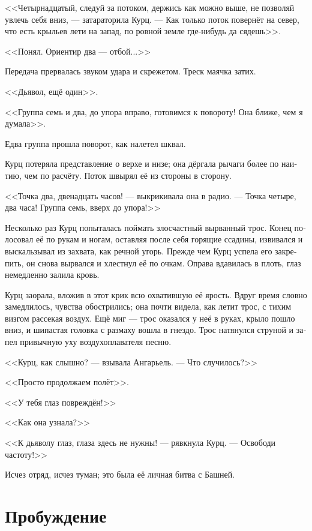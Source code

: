 \documentclass[a4paper,12pt,fleqn]{book}\usepackage{polyglossia}\setdefaultlanguage[babelshorthands=true]{russian}\setotherlanguage{english}\defaultfontfeatures{Ligatures=TeX,Mapping=tex-text}\usepackage{xcolor}\newcommand{\ml}[3]{#2}
\begin{document}
<<Четырнадцатый, следуй за потоком, держись как можно выше, не позволяй увлечь себя вниз, --- затараторила Курц.
--- Как только поток повернёт на север, что есть крыльев лети на запад, по ровной земле где-нибудь да сядешь>>.

\ml{$0$}
{<<Понял.}
{``Roger that.}
\ml{$0$}
{Ориентир два --- отбой...>>}
{Beacon two is off---''}

Передача прервалась звуком удара и скрежетом.
Треск маячка затих.

<<Дьявол, ещё один>>.

<<Группа семь и два, до упора вправо, готовимся к повороту!
Она ближе, чем я думала>>.

Едва группа прошла поворот, как налетел шквал.

Курц потеряла представление о верхе и низе;
она дёргала рычаги более по наитию, чем по расчёту.
Поток швырял её из стороны в сторону.

<<Точка два, двенадцать часов! --- выкрикивала она в радио.
--- Точка четыре, два часа!
Группа семь, вверх до упора!>>

Несколько раз Курц попыталась поймать злосчастный вырванный трос.
Конец полосовал её по рукам и ногам, оставляя после себя горящие ссадины, извивался и выскальзывал из захвата, как речной угорь.
Прежде чем Курц успела его закрепить, он снова вырвался и хлестнул её по очкам.
Оправа вдавилась в плоть, глаз немедленно залила кровь.

Курц заорала, вложив в этот крик всю охватившую её ярость.
Вдруг время словно замедлилось, чувства обострились;
она почти видела, как летит трос, с тихим визгом рассекая воздух.
Ещё миг --- трос оказался у неё в руках, крыло пошло вниз, и шипастая головка с размаху вошла в гнездо.
Трос натянулся струной и запел привычную уху воздухоплавателя песню.

<<Курц, как слышно? --- взывала Ангарьель.
--- Что случилось?>>

<<Просто продолжаем полёт>>.

<<У тебя глаз повреждён!>>

<<Как она узнала?>>

<<К дьяволу глаз, глаза здесь не нужны! --- рявкнула Курц.
--- Освободи частоту!>>

Исчез отряд, исчез туман;
это была её личная битва с Башней.

\section{Пробуждение}
\end{document}
